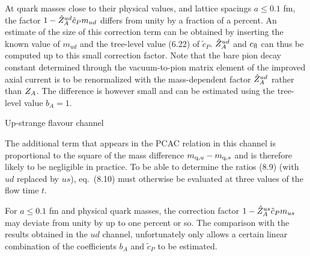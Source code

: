 At quark masses close to their physical values, and lattice spacings
$a\leq0.1$ fm,
the factor $1-\hat{Z}_A^{ud}\tilde{c}_Pm_{ud}$ differs
from unity by a fraction of a percent.
An estimate of the size of this correction
term can be obtained by inserting the known value of $m_{ud}$ and 
the tree-level value (6.22) of $\tilde{c}_{P}$.
$\hat{Z}_A^{ud}$ and $c_{\rm fl}$ can thus be computed up to this
small correction factor. Note that the bare pion decay constant
determined through the vacuum-to-pion matrix element of the improved
axial current is to be renormalized with the
mass-dependent factor $\hat{Z}_A^{ud}$ rather than $Z_A$. The difference
is however small and can be estimated using the 
tree-level value $b_A=1$.


 Up-strange flavour channel

The additional term that appears in the PCAC relation
in this channel is proportional to the square of the mass 
difference $m_{{\rm q},u}-m_{{\rm q},s}$ and is therefore 
likely to be negligible in practice.
To be able to determine the ratios (8.9) (with $ud$ replaced by $us$),
eq.~(8.10) must otherwise be evaluated at
three values of the flow time $t$.

For $a\leq0.1$ fm and physical quark masses,
the correction factor $1-\hat{Z}_A^{us}\tilde{c}_Pm_{us}$ 
may deviate from unity by up to one percent or so.
The comparison with the results obtained in the $ud$ channel,
unfortunately only allows a certain linear combination of the coefficients 
$b_A$ and $\tilde{c}_P$ to be estimated.

